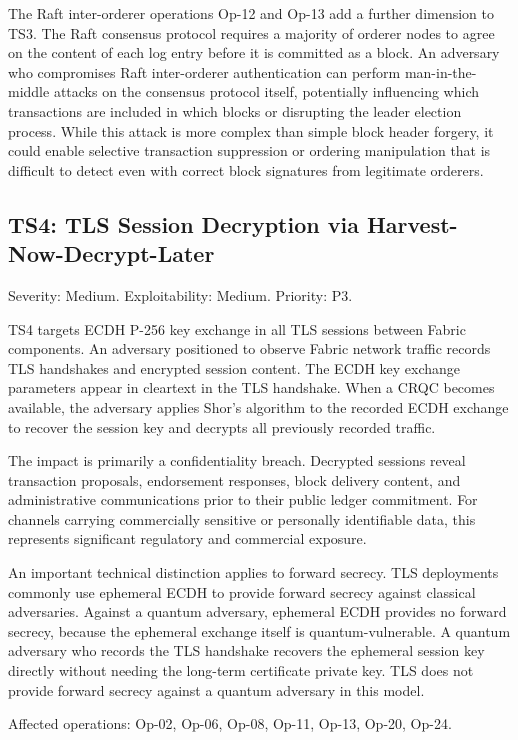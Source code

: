 \documentclass[conference]{IEEEtran}
\begin{document}
The Raft inter-orderer operations Op-12 and Op-13 add a further dimension
to TS3. The Raft consensus protocol requires a majority of orderer nodes
to agree on the content of each log entry before it is committed as a
block. An adversary who compromises Raft inter-orderer authentication
can perform man-in-the-middle attacks on the consensus protocol itself,
potentially influencing which transactions are included in which blocks
or disrupting the leader election process. While this attack is more
complex than simple block header forgery, it could enable selective
transaction suppression or ordering manipulation that is difficult to
detect even with correct block signatures from legitimate orderers.

\subsection{TS4: TLS Session Decryption via Harvest-Now-Decrypt-Later}

Severity: Medium. Exploitability: Medium. Priority: P3.

TS4 targets ECDH P-256 key exchange in all TLS sessions between Fabric
components. An adversary positioned to observe Fabric network traffic
records TLS handshakes and encrypted session content. The ECDH key
exchange parameters appear in cleartext in the TLS handshake. When a
CRQC becomes available, the adversary applies Shor's algorithm to the
recorded ECDH exchange to recover the session key and decrypts all
previously recorded traffic.

The impact is primarily a confidentiality breach. Decrypted sessions
reveal transaction proposals, endorsement responses, block delivery
content, and administrative communications prior to their public ledger
commitment. For channels carrying commercially sensitive or personally
identifiable data, this represents significant regulatory and commercial
exposure.

An important technical distinction applies to forward secrecy. TLS
deployments commonly use ephemeral ECDH to provide forward secrecy
against classical adversaries. Against a quantum adversary, ephemeral
ECDH provides no forward secrecy, because the ephemeral exchange itself
is quantum-vulnerable. A quantum adversary who records the TLS handshake
recovers the ephemeral session key directly without needing the long-term
certificate private key. TLS does not provide forward secrecy against a
quantum adversary in this model.

Affected operations: Op-02, Op-06, Op-08, Op-11, Op-13, Op-20, Op-24.
\end{document}
